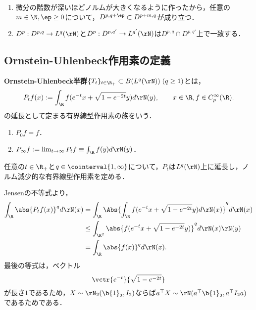 \documentclass[uplatex,dvipdfmx]{jsreport}
\begin{document}
\begin{lemma}[相互関係]\mbox{}
    \begin{enumerate}
        \item 微分の階数が深いほどノルムが大きくなるように作ったから，任意の$m\in\N,\ep\ge0$について，$D^{p,q+\ep}\subset D^{p+m,q}$が成り立つ．
        \item $D^p:D^{p,q}\to L^q(\rN)$と$D^p:D^{p,q'}\to L^{q'}(\rN)$は$D^{p,q}\cap D^{p,q'}$上で一致する．
    \end{enumerate}
\end{lemma}

\subsection{Ornstein-Uhlenbeck作用素の定義}

\begin{definition}
    \textbf{Ornstein-Uhlenbeck半群}$\{T_t\}_{t\in\R_+}\subset B(L^q(\rN))\;(q\ge1)$とは，
    \[P_tf(x):=\int_\R f(e^{-t}x+\sqrt{1-e^{-2t}}y)d\rN(y),\qquad x\in\R,f\in C_p^\infty(\R).\]
    の延長として定まる有界線型作用素の族をいう．
\end{definition}

\begin{lemma}\mbox{}
    \begin{enumerate}
        \item $P_0f=f$．
        \item $P_\infty f:=\lim_{t\to\infty}P_tf\equiv\int_\R f(y)d\rN(y)$．
    \end{enumerate}
\end{lemma}

\begin{proposition}
    任意の$t\in\R_+$と$q\in\cointerval{1,\infty}$について，$P_t$は$L^q(\rN)$上に延長し，ノルム減少的な有界線型作用素を定める．
\end{proposition}
\begin{Proof}
    Jensenの不等式より，
    \begin{align*}
        \int_\R\abs{P_tf(x)}^qd\rN(x)&=\int_\R\Abs{\int_\R f(e^{-t}x+\sqrt{1-e^{-2t}}y)d\rN(x)}^qd\rN(x)\\
        &\le\int_{\R^2}\abs{f(e^{-t}x+\sqrt{1-e^{-2t}}y)}^qd\rN(x)\rN(y)\\
        &=\int_\R\abs{f(x)}^qd\rN(x).
    \end{align*}
    最後の等式は，ベクトル
    \[\vctr{e^{-t}}{\sqrt{1-e^{-2t}}}\]
    が長さ$1$であるため，$X\sim\rN_2(\b{1}_2,I_2)$ならば$a^\top X\sim\rN(a^\top\b{1}_2,a^\top I_2 a)$であるためである．
\end{Proof}
\end{document}
